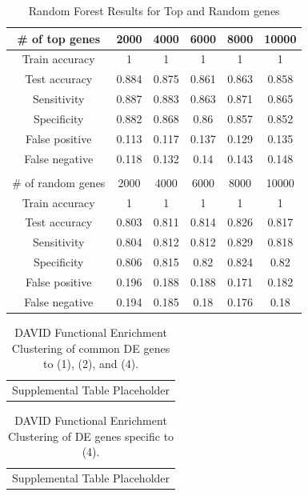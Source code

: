 \documentclass[fleqn,10pt,table]{wlscirep}
\begin{document}
\begin{table}[ht]
\caption{Random Forest Results for Top and Random genes}
\centering
\begin{tabular}{cccccc} \hline
\# of top genes		& 2000	 	& 4000		& 6000		& 8000		& 10000 	\\ \hline
Train accuracy		& 1			& 1			& 1			& 1			& 1				\\ 
Test accuracy		& 0.884		& 0.875 	& 0.861		& 0.863 	& 0.858			\\ 
Sensitivity			& 0.887		& 0.883		& 0.863		& 0.871 	& 0.865			\\ 
Specificity			& 0.882		& 0.868		& 0.86		& 0.857 	& 0.852			\\
False positive		& 0.113		& 0.117		& 0.137		& 0.129 	& 0.135			\\
False negative		& 0.118		& 0.132		& 0.14		& 0.143 	& 0.148			\\ \hline \\ \hline
\# of random genes	& 2000	 	& 4000		& 6000		& 8000		& 10000 	\\ \hline
Train accuracy		& 1			& 1			& 1			& 1			& 1				\\ 
Test accuracy		& 0.803		& 0.811 	& 0.814		& 0.826 	& 0.817			\\ 
Sensitivity			& 0.804		& 0.812		& 0.812		& 0.829 	& 0.818			\\ 
Specificity			& 0.806		& 0.815		& 0.82		& 0.824 	& 0.82			\\
False positive		& 0.196		& 0.188		& 0.188		& 0.171 	& 0.182			\\
False negative		& 0.194		& 0.185		& 0.18		& 0.176 	& 0.18			\\ \hline
\end{tabular}
\end{table}

\begin{table}[ht]
    \centering
    \begin{tabular}{c}
    Supplemental Table Placeholder
    \end{tabular}
    \caption{DAVID Functional Enrichment Clustering of common DE genes to (1), (2), and (4).}
    \label{tab:supp_early_genes_DAVID}
\end{table}

\begin{table}[ht]
    \centering
    \begin{tabular}{c}
    Supplemental Table Placeholder
    \end{tabular}
    \caption{DAVID Functional Enrichment Clustering of DE genes specific to (4).}
    \label{tab:supp_cau_genes_DAVID}
\end{table}
\end{document}
